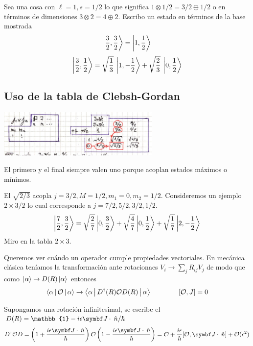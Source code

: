 \documentclass[10pt,oneside]{CBFT_book}
\begin{document}
Sea una cosa con $\ell=1, s=1/2$ lo que significa  $ 1 \otimes 1/2 = 3/2 \oplus 1/2$ o en términos
de dimensiones $ 3 \otimes 2 = 4 \oplus 2 $.
Escribo un estado en términos de la base mostrada
\[
	\Ket{ \frac 3 2 , \frac 3 2 } = \Ket{ 1 , \frac 1 2 }
\]
\[
	\Ket{ \frac 3 2 , \frac 1 2 } = 
	\sqrt{\frac{1}{3}} \: \Ket{ 1 , -\frac 1 2 } + \sqrt{\frac{2}{3}} \: \Ket{ 0 , \frac 1 2 }
\]


\subsection{Uso de la tabla de Clebsh-Gordan}


\includegraphics[width=0.60\textwidth]{images/fig_ft2_clebsh_gordan_table.jpg}

El primero y el final siempre valen uno porque acoplan estados máximos o mínimos.


El $\sqrt{2/3}$ acopla $j=3/2, M=1/2, m_1=0, m_2 =1/2$. Consideremos un ejemplo $2 \times 3/2$ lo cual 
corresponde a $j=7/2, 5/2, 3/2, 1/2$.
\[
	\Ket{\frac 7 2 , \frac 3 2} = \sqrt{\frac{2}{7}} \Ket{0,\frac 3 2} +
	\sqrt{\frac{4}{7}} \Ket{0,\frac 1 2} + \sqrt{\frac{1}{7}} \Ket{2,-\frac 1 2}
\]
Miro en la tabla $2\times 3$.

Queremos ver cuándo un operador cumple propiedades vectoriales. En mecánica clásica teníamos la transformación
ante rotacionaes $V_i \to \sum_j R_{ij} V_j$ de modo que como $\Ket{\alpha} \to D(R)\Ket{\alpha}$ entonces
\[
	\Braket{\alpha|\mathcal{O}|\alpha} \to \Braket{\alpha | D^\dagger(R) \mathcal{O} D(R)|\alpha} 
	\qquad \qquad [\mathcal{O},J] =0
\]

Supongamos una rotación infinitesimal, se escribe el $D(R) = \mathbb{1} - i \epsilon \vb J \cdot \nver / \hbar$
\[
	D^\dagger \mathcal{O} D = \left( 1 + \frac{i\epsilon \vb J \cdot \nver}{\hbar}\right) 
	\mathcal{O} \left( 1 - \frac{i\epsilon \vb J \cdot \nver}{\hbar}\right) =  \mathcal{O}
	+ \frac{i\epsilon}{\hbar} [\mathcal{O},\vb J \cdot \nver] + \mathcal{O}(\epsilon^2)
\]
\end{document}
